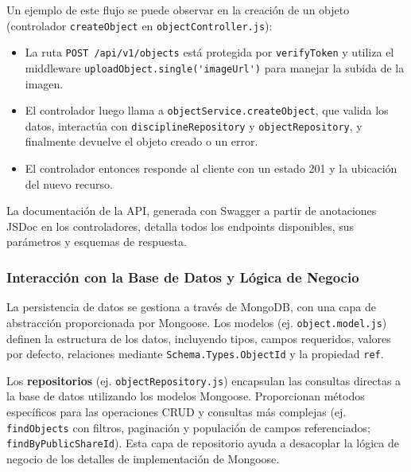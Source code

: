 Un ejemplo de este flujo se puede observar en la creación de un objeto (controlador \texttt{createObject} en \texttt{objectController.js}): 
\begin{itemize}
    \item La ruta \texttt{POST /api/v1/objects} está protegida por \texttt{verifyToken} y utiliza el middleware \verb|uploadObject.single('imageUrl')| para manejar la subida de la imagen.
    \item El controlador luego llama a \texttt{objectService.createObject}, que valida los datos, interactúa con \texttt{disciplineRepository} y \texttt{objectRepository}, y finalmente devuelve el objeto creado o un error.
    \item El controlador entonces responde al cliente con un estado 201 y la ubicación del nuevo recurso.
     
\end{itemize}   
La documentación de la API, generada con Swagger a partir de anotaciones JSDoc en los controladores, detalla todos los endpoints disponibles, sus parámetros y esquemas de respuesta.

\subsubsection{Interacción con la Base de Datos y Lógica de Negocio}
\label{sssec:backendDbLogica}

La persistencia de datos se gestiona a través de MongoDB, con una capa de abstracción proporcionada por Mongoose. Los modelos (ej. \texttt{object.model.js}) definen la estructura de los datos, incluyendo tipos, campos requeridos, valores por defecto, relaciones mediante \texttt{Schema.Types.ObjectId} y la propiedad \texttt{ref}.

Los \textbf{repositorios} (ej. \texttt{objectRepository.js}) encapsulan las consultas directas a la base de datos utilizando los modelos Mongoose. Proporcionan métodos específicos para las operaciones CRUD y consultas más complejas (ej. \texttt{findObjects} con filtros, paginación y populación de campos referenciados; \texttt{findByPublicShareId}). Esta capa de repositorio ayuda a desacoplar la lógica de negocio de los detalles de implementación de Mongoose.

